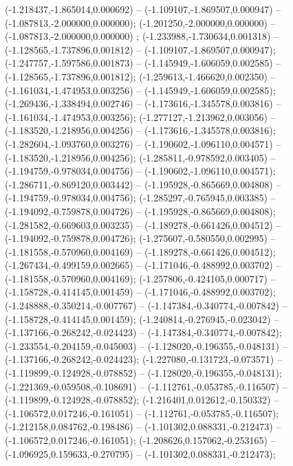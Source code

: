  (-1.218437,-1.865014,0.000692) -- (-1.109107,-1.869507,0.000947) -- (-1.087813,-2.000000,0.000000);
 (-1.201250,-2.000000,0.000000) -- (-1.087813,-2.000000,0.000000) ;
 (-1.233988,-1.730634,0.001318) -- (-1.128565,-1.737896,0.001812) -- (-1.109107,-1.869507,0.000947);
 (-1.247757,-1.597586,0.001873) -- (-1.145949,-1.606059,0.002585) -- (-1.128565,-1.737896,0.001812);
 (-1.259613,-1.466620,0.002350) -- (-1.161034,-1.474953,0.003256) -- (-1.145949,-1.606059,0.002585);
 (-1.269436,-1.338494,0.002746) -- (-1.173616,-1.345578,0.003816) -- (-1.161034,-1.474953,0.003256);
 (-1.277127,-1.213962,0.003056) -- (-1.183520,-1.218956,0.004256) -- (-1.173616,-1.345578,0.003816);
 (-1.282604,-1.093760,0.003276) -- (-1.190602,-1.096110,0.004571) -- (-1.183520,-1.218956,0.004256);
 (-1.285811,-0.978592,0.003405) -- (-1.194759,-0.978034,0.004756) -- (-1.190602,-1.096110,0.004571);
 (-1.286711,-0.869120,0.003442) -- (-1.195928,-0.865669,0.004808) -- (-1.194759,-0.978034,0.004756);
 (-1.285297,-0.765945,0.003385) -- (-1.194092,-0.759878,0.004726) -- (-1.195928,-0.865669,0.004808);
 (-1.281582,-0.669603,0.003235) -- (-1.189278,-0.661426,0.004512) -- (-1.194092,-0.759878,0.004726);
 (-1.275607,-0.580550,0.002995) -- (-1.181558,-0.570960,0.004169) -- (-1.189278,-0.661426,0.004512);
 (-1.267434,-0.499159,0.002665) -- (-1.171046,-0.488992,0.003702) -- (-1.181558,-0.570960,0.004169);
 (-1.257806,-0.424105,0.000717) -- (-1.158728,-0.414145,0.001459) -- (-1.171046,-0.488992,0.003702);
 (-1.248888,-0.350214,-0.007767) -- (-1.147384,-0.340774,-0.007842) -- (-1.158728,-0.414145,0.001459);
 (-1.240814,-0.276945,-0.023042) -- (-1.137166,-0.268242,-0.024423) -- (-1.147384,-0.340774,-0.007842);
 (-1.233554,-0.204159,-0.045003) -- (-1.128020,-0.196355,-0.048131) -- (-1.137166,-0.268242,-0.024423);
 (-1.227080,-0.131723,-0.073571) -- (-1.119899,-0.124928,-0.078852) -- (-1.128020,-0.196355,-0.048131);
 (-1.221369,-0.059508,-0.108691) -- (-1.112761,-0.053785,-0.116507) -- (-1.119899,-0.124928,-0.078852);
 (-1.216401,0.012612,-0.150332) -- (-1.106572,0.017246,-0.161051) -- (-1.112761,-0.053785,-0.116507);
 (-1.212158,0.084762,-0.198486) -- (-1.101302,0.088331,-0.212473) -- (-1.106572,0.017246,-0.161051);
 (-1.208626,0.157062,-0.253165) -- (-1.096925,0.159633,-0.270795) -- (-1.101302,0.088331,-0.212473);
